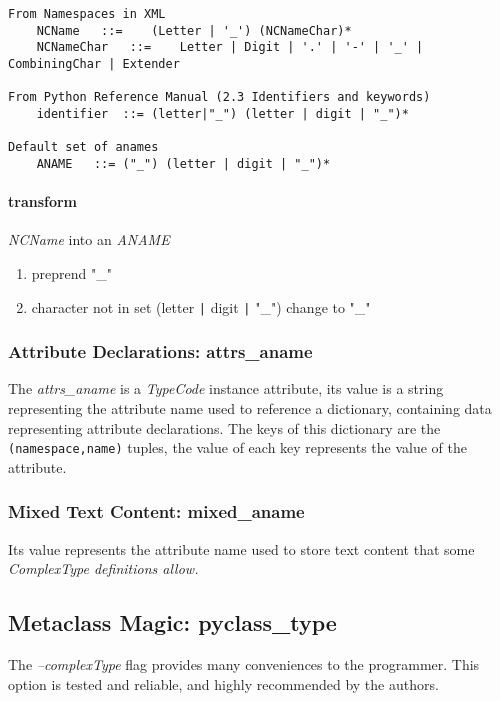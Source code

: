 
\begin{verbatim}
From Namespaces in XML
	NCName	 ::=	(Letter | '_') (NCNameChar)*
	NCNameChar	 ::=	Letter | Digit | '.' | '-' | '_' | CombiningChar | Extender

From Python Reference Manual (2.3 Identifiers and keywords)
	identifier	::=	(letter|"_") (letter | digit | "_")*

Default set of anames
	ANAME	::=	("_") (letter | digit | "_")*
\end{verbatim}

\paragraph{transform} {\it NCName} into an {\it ANAME}
\begin{enumerate}
\item preprend "_"
\item character not in set (letter \verb!|! digit \verb!|! "_") change to "_"
\end{enumerate}
\par

\subsubsection{Attribute Declarations: attrs_aname}
The {\it attrs_aname} is a {\it TypeCode} instance attribute, its value is a string representing the
attribute name used to reference a dictionary, containing data representing
attribute declarations.  The keys of this dictionary are the
\verb!(namespace,name)! tuples, the value of each key represents the value of
the attribute.


\subsubsection{Mixed Text Content: mixed_aname}
Its value represents the attribute name used to store text content that some
\it{ComplexType} definitions allow.

\subsection{Metaclass Magic: pyclass_type}
\label{subsection:MM}
The {\it --complexType} flag provides many conveniences to the programmer. This
option is tested and reliable, and highly recommended by the authors.

